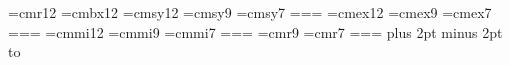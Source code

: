 %
%
\font\tenrm=cmr12 \font\tenbf=cmbx12 \rm
\font\tensy=cmsy12 \font\ninesy=cmsy9 \font\sevensy=cmsy7
=\tensy {}=\ninesy {}=\sevensy
\font\tenex=cmex12 \font\nineex=cmex9 \font\sevenex=cmex7
=\tenex {}=\nineex {}=\sevenex
\font\tenmi=cmmi12 \font\ninemi=cmmi9 \font\sevenmi=cmmi7
=\tenmi {}=\ninemi {}=\sevenmi
\font\ninerm=cmr9 \font\sevenrm=cmr7
=\tenrm {}=\ninerm {}=\sevenrm
%
%
\newcount\quizno \newtoks\dattoks \newtoks\secno \newtoks\classno
\newcount\probno {} \parskip 3pt plus 2pt minus 2pt
%
%
%
\footline{\hfil}
%
%
\hbox to
%
%
\def\prob{%
\ifnum\probno>1
	\vfil
\else
	\smallskip
\fi %
\ifdim\lastskip=0pt
	\smallskip
\fi
\penalty-150
\ifdim \pagetotal>0pt
	\smallskip
\fi
\noindent{\bf Problem \the\probno}: \advance\probno by1 \relax }
%
%
\def\soln{\bigskip\noindent{\bf Solution}: }
